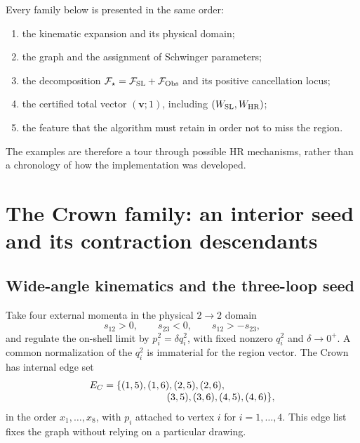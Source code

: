 \documentclass[a4paper,11pt]{article}
\newcommand{\FSL}{\mathcal F_{\rm SL}}
\newcommand{\FObs}{\mathcal F_{\rm Obs}}
\newcommand{\WSL}{W_{\rm SL}}
\newcommand{\WHR}{W_{\rm HR}}
\begin{document}
Every family below is presented in the same order:
\begin{enumerate}[label=(\roman*)]
 \item the kinematic expansion and its physical domain;
 \item the graph and the assignment of Schwinger parameters;
 \item the decomposition \(\mathcal F_\star=\FSL+\FObs\) and its positive
 cancellation locus;
 \item the certified total vector \((\boldsymbol v;1)\), including
 \((\WSL,\WHR)\);
 \item the feature that the algorithm must retain in order not to miss the
 region.
\end{enumerate}
The examples are therefore a tour through possible HR mechanisms, rather
than a chronology of how the implementation was developed.

\section{The Crown family: an interior seed and its contraction descendants}
\label{sec:example-crown}

\subsection{Wide-angle kinematics and the three-loop seed}

Take four external momenta in the physical \(2\to2\) domain
\begin{equation}
 s_{12}>0,\qquad s_{23}<0,\qquad s_{12}>-s_{23},
 \label{eq:crown-domain}
\end{equation}
and regulate the on-shell limit by \(p_i^2=\delta q_i^2\), with fixed
nonzero \(q_i^2\) and \(\delta\to0^+\).  A common normalization of the
\(q_i^2\) is immaterial for the region vector.  The Crown has internal edge
set
\begin{equation}
 \begin{split}
 E_C={}&\{(1,5),(1,6),(2,5),(2,6),\\[-1mm]
       &\hspace{18mm}(3,5),(3,6),(4,5),(4,6)\},
 \end{split}
 \label{eq:crown-edges}
\end{equation}
in the order \(x_1,\ldots,x_8\), with \(p_i\) attached to vertex \(i\) for
\(i=1,\ldots,4\).  This edge list fixes the graph without relying on a
particular drawing.
\end{document}
